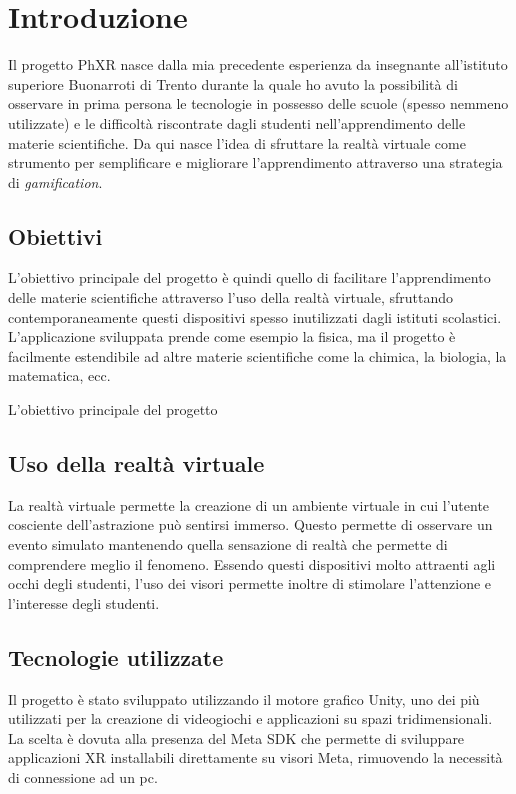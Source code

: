 \chapter{Introduzione}
\label{cha:introduzione}

Il progetto PhXR nasce dalla mia precedente esperienza da insegnante all'istituto
superiore Buonarroti di Trento durante la quale ho avuto la possibilità di
osservare in prima persona le tecnologie in possesso delle scuole (spesso nemmeno
utilizzate) e le difficoltà riscontrate dagli studenti nell'apprendimento delle
materie scientifiche. Da qui nasce l'idea di sfruttare la realtà virtuale come strumento
per semplificare e migliorare l'apprendimento attraverso una strategia di \textit{gamification}.

\section{Obiettivi}
\label{sec:introduzione_obiettivi}

L'obiettivo principale del progetto è quindi quello di facilitare l'apprendimento
delle materie scientifiche attraverso l'uso della realtà virtuale, sfruttando
contemporaneamente questi dispositivi spesso inutilizzati dagli istituti
scolastici. L'applicazione sviluppata prende come esempio la fisica, ma il
progetto è facilmente estendibile ad altre materie scientifiche come la chimica, la
biologia, la matematica, ecc.

L'obiettivo principale del progetto

\section{Uso della realtà virtuale}
\label{sec:introduzione_uso_realtà_virtuale}

La realtà virtuale permette la creazione di un ambiente virtuale in cui l'utente
cosciente dell'astrazione può sentirsi immerso. Questo permette di osservare un
evento simulato mantenendo quella sensazione di realtà che permette di
comprendere meglio il fenomeno. Essendo questi dispositivi molto attraenti agli occhi
degli studenti, l'uso dei visori permette inoltre di stimolare l'attenzione e l'interesse
degli studenti.

\section{Tecnologie utilizzate}
\label{sec:introduzione_tecnologie_utilizzate}

Il progetto è stato sviluppato utilizzando il motore grafico Unity, uno dei più
utilizzati per la creazione di videogiochi e applicazioni su spazi
tridimensionali. La scelta è dovuta alla presenza del Meta SDK che permette di sviluppare
applicazioni XR installabili direttamente su visori Meta, rimuovendo la
necessità di connessione ad un pc.
